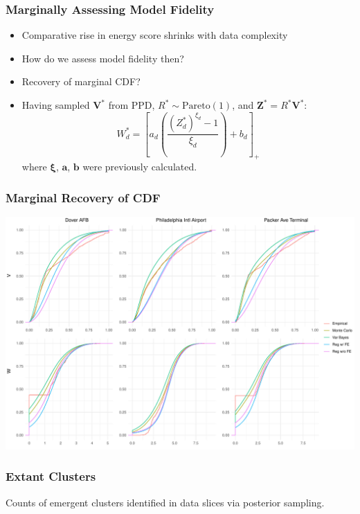 \documentclass[aspectratio=169,10pt,notes]{beamer}
\newlength{\frametextheight}
\begin{document}
\begin{frame}
    \frametitle{Marginally Assessing Model Fidelity}
    \begin{itemize}
        \item Comparative rise in energy score shrinks with data complexity
        \item How do we assess model fidelity then?
        \item Recovery of marginal CDF?
        \item Having sampled $\bm{V}^*$ from PPD, $R^*\sim\text{Pareto}(1)$, and $\bm{Z}^* = R^*\bm{V}^*$:
        \[
             W_d^* = \left[a_d\left(\frac{(Z_d^*)^{\xi_d} - 1}{\xi_d}\right) + b_d\right]_+
        \]
        where $\bm{\xi}$, $\bm{a}$, $\bm{b}$ were previously calculated.
    \end{itemize}
\end{frame} %

\begin{frame}
    \frametitle{Marginal Recovery of CDF}
    \begin{center}
        \includegraphics[height=0.99\frametextheight]{./ch3/plots/delaware_marginal_cdfs}
    \end{center}
\end{frame} %

\begin{frame}
    \frametitle{Extant Clusters}
    \begin{center}
        
    \end{center}
    {\footnotesize Counts of emergent clusters identified in data slices via posterior sampling.}
\end{frame} %
\end{document}
